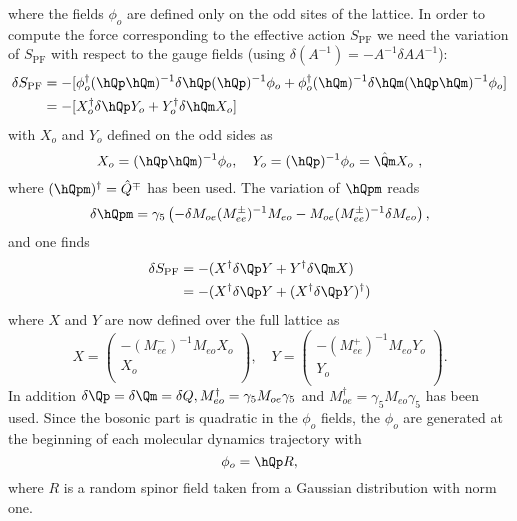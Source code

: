 where the fields $\phi_o$ are defined only on the odd sites of the
lattice. In order to compute the force corresponding to the effective
action $S_\mathrm{PF}$ we need the variation of $S_\mathrm{PF}$ with respect to the gauge fields
(using $\delta (A^{-1})=-A^{-1}\delta A A^{-1}$):
\begin{equation}
  \label{eq:eo5}
  \begin{split}
    \delta S_\mathrm{PF} &= -[\phi_o^\dagger (\hQp \hQm)^{-1}\delta \hQp(\hQp)^{-1}\phi_o +
    \phi_o^\dagger(\hQm)^{-1}\delta \hQm (\hQp \hQm)^{-1} \phi_o ] \\
     &= -[X_o^\dagger \delta \hQp Y_o + Y_o^\dagger \delta\hQm X_o]
  \end{split}
\end{equation}
with $X_o$ and $Y_o$ defined on the odd sides as 
\begin{equation}
  \label{eq:eo6}
  X_o = (\hQp \hQm)^{-1} \phi_o,\quad Y_o = (\hQp)^{-1}\phi_o=\hat
  \Qm X_o\ ,
\end{equation}
where $(\hQpm)^\dagger = \hat Q^\mp$ has been used. The variation of
$\hQpm$ reads
\begin{equation}
  \label{eq:eo7}
  \delta \hQpm = \gamma_5\left(-\delta M_{oe}(M_{ee}^\pm )^{-1}M_{eo} -
    M_{oe}(M_{ee}^\pm )^{-1}\delta M_{eo}\right),
\end{equation}
and one finds
\begin{equation}
  \label{eq:eo8}
  \begin{split}
    \delta S_\mathrm{PF} &= -(X^\dagger\delta \Qp Y + Y^\dagger\delta \Qm X) \\
    &= -(X^\dagger\delta \Qp Y +(X^\dagger\delta \Qp Y)^\dagger)
  \end{split}
\end{equation}
where $X$ and $Y$ are now defined over the full lattice as
\begin{equation}
  \label{eq:eo9}
  X = 
  \begin{pmatrix}
    -(M_{ee}^-)^{-1}M_{eo}X_o \\ X_o\\
  \end{pmatrix},\quad
  Y = 
  \begin{pmatrix}
    -(M_{ee}^+)^{-1}M_{eo}Y_o \\ Y_o\\
  \end{pmatrix}.
\end{equation}
In addition $\delta\Qp = \delta\Qm= \delta Q, M_{eo}^\dagger = \gamma_5 M_{oe}\gamma_5$ and
$M_{oe}^\dagger = \gamma_5 M_{eo}\gamma_5$ has been used. Since the bosonic part
is quadratic in the $\phi_o$ fields, the $\phi_o$ are generated at the
beginning of each molecular dynamics trajectory with
\begin{equation}
  \label{eq:eo10}
  \phi_o = \hQp R,
\end{equation}
where $R$ is a random spinor field taken from a Gaussian distribution
with norm one.

